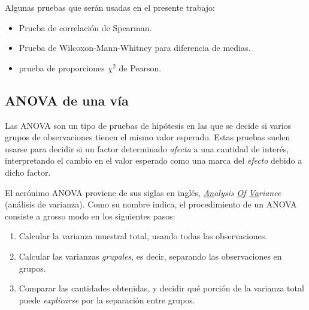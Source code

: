 \documentclass[12pt,letterpaper]{book}
\begin{document}
Algunas pruebas que serán usadas en el presente trabajo:
\begin{itemize}
\item Prueba de correlación de Spearman.
\item Prueba de Wilcoxon-Mann-Whitney para diferencia de medias.
\item prueba de proporciones $\chi^2$ de Pearson.
\end{itemize}

\subsection{ANOVA de una vía}

Las ANOVA son un tipo de pruebas de hipótesis en las que se decide si varios grupos de observaciones tienen el mismo valor esperado.
%
Estas pruebas suelen usarse para decidir si un factor determinado \textit{afecta} a una cantidad de interés, interpretando el cambio en el valor esperado como una marca del \textit{efecto} debido a dicho factor.

%
%

El acrónimo ANOVA proviene de sus siglas en inglés, \textit{\underline{An}alysis \underline{O}f \underline{Va}riance} (análisis de varianza). 
%
Como su nombre indica, el procedimiento de un ANOVA consiste a grosso modo en los siguientes pasos:
\begin{enumerate}
\item Calcular la varianza muestral total, usando todas las observaciones.
\item Calcular las varianzas \textit{grupales}, es decir, separando las observaciones en grupos.
\item Comparar las cantidades obtenidas, y decidir qué porción de la varianza total puede \textit{explicarse} por la separación entre grupos.
\end{enumerate} 
\end{document}
